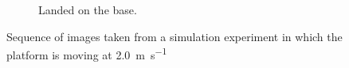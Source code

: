 \begin{figure}[!htbp]
\begin{subfigure}[b]{0.3\textwidth}
        \caption{Landed on the base.}
        \label{fig:five}
   \end{subfigure}
   
  \caption{Sequence of images taken from a simulation experiment in which the platform is moving at \SI{2.0}{\meter \per \second} }
  \label{fig:landing2}
\end{figure} 

